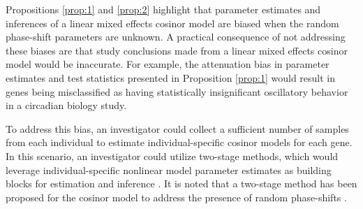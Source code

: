 Propositions \ref{prop:1} and \ref{prop:2} highlight that parameter estimates and inferences of a linear mixed effects cosinor model are biased when the random phase-shift parameters are unknown. A practical consequence of not addressing these biases are that study conclusions made from a linear mixed effects cosinor model would be inaccurate. For example, the attenuation bias in parameter estimates and test statistics presented in Proposition \ref{prop:1} would result in genes being misclassified as having statistically insignificant oscillatory behavior in a circadian biology study.   

To address this bias, an investigator could collect a sufficient number of samples from each individual to estimate individual-specific cosinor models for each gene. In this scenario, an investigator could utilize two-stage methods, which would leverage individual-specific nonlinear model parameter estimates as building blocks for estimation and inference \citep[Chapter 5]{Davidian1995}. It is noted that a two-stage method has been proposed for the cosinor model to address the presence of random phase-shifts \citep{Weaver1995}. 


